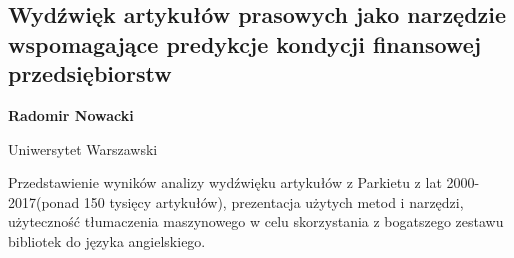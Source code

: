 \documentclass[\main/boa.tex]{subfiles}
\begin{document}
\subsection[Wydźwięk artykułów prasowych jako narzędzie wspomagające predykcje \\ kondycji finansowej przedsiębiorstw]{Wydźwięk artykułów prasowych jako narzędzie wspomagające predykcje kondycji finansowej przedsiębiorstw}

\begin{minipage}{0.915\textwidth}
	\centering
  {\bf {} Radomir Nowacki}
\end{minipage}



\begin{affiliations}
\begin{minipage}{0.915\textwidth}
\centering
Uniwersytet Warszawski  \\[-2pt]
\end{minipage}
\end{affiliations}

\vskip 0.3cm

 Przedstawienie wyników analizy wydźwięku artykułów z Parkietu z lat 2000-2017(ponad 150 tysięcy artykułów), prezentacja użytych metod i narzędzi, użyteczność tłumaczenia maszynowego w celu skorzystania z bogatszego zestawu bibliotek do języka angielskiego. 
\end{document}

